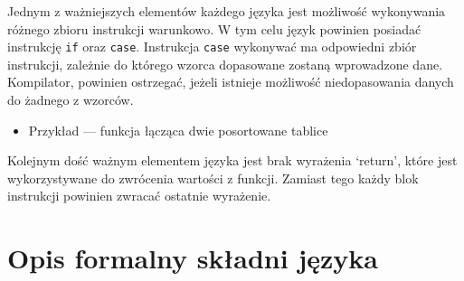 \documentclass[a4paper,12pt]{book} %
\begin{document}

\newpage



\newpage
Jednym z ważniejszych elementów każdego języka jest możliwość wykonywania różnego zbioru instrukcji warunkowo. W tym celu język powinien posiadać instrukcję \lstinline$if$ oraz \lstinline$case$. Instrukcja \lstinline$case$ wykonywać ma odpowiedni zbiór instrukcji, zależnie do którego wzorca dopasowane zostaną wprowadzone dane. Kompilator, powinien ostrzegać, jeżeli istnieje możliwość niedopasowania danych do żadnego z wzorców.

\begin{itemize}
  
  \item Przykład --- funkcja łącząca dwie posortowane tablice
        \newpage
        
\end{itemize}

\newpage
Kolejnym dość ważnym elementem języka jest brak wyrażenia `return', które jest wykorzystywane do zwrócenia wartości z funkcji. Zamiast tego każdy blok instrukcji powinien zwracać ostatnie wyrażenie.






\section{Opis formalny składni języka}
\end{document}
